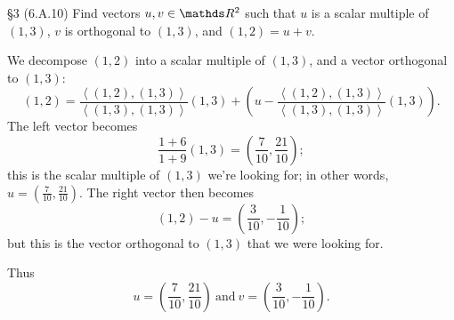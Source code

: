 \documentclass{review-sheet}
\begin{document}
\begin{problem}{\S 3}
  (6.A.10) Find vectors $u,v\in \R^2$ such that $u$ is a scalar multiple of $(1,3)$, $v$ is
  orthogonal to $(1,3)$, and $(1,2)=u+v$. 
\end{problem}

\begin{solution}
  We decompose $(1,2)$ into a scalar multiple of $(1,3)$, and a vector orthogonal to $(1,3)$: \[
    (1,2)=\frac{\left<(1,2),(1,3) \right>}{\left<(1,3),(1,3) \right>}(1,3)+\left(
    u-\frac{\left<(1,2),(1,3) \right>}{\left<(1,3),(1,3) \right>}(1,3) \right) 
  .\] The left vector becomes \[
  \frac{1+6}{1+9}(1,3)=\left( \frac{7}{10}, \frac{21}{10} \right) 
  ;\] this is the scalar multiple of $(1,3)$ we're looking for; in other words, $u=\left(
  \frac{7}{10},\frac{21}{10} \right) $. The right vector then becomes \[
    (1,2)-u=\left( \frac{3}{10},-\frac{1}{10} \right) 
  ;\] but this is the vector orthogonal to $(1,3)$ that we were looking for.

  Thus \[
    u=\left( \frac{7}{10},\frac{21}{10} \right) ~\text{and}~ v=\left( \frac{3}{10},-\frac{1}{10} \right) 
  .\] 
\end{solution}
\end{document}

